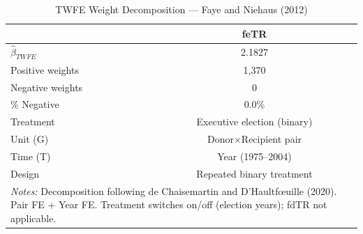 \begin{table}[htbp]
\centering
\caption{TWFE Weight Decomposition --- Faye and Niehaus (2012)}
\label{tab:fayeniehaus_twowayfe}
\begin{tabular}{lc}
\toprule
 & feTR \\
\midrule
$\hat{\beta}_{TWFE}$ & 2.1827 \\
Positive weights & 1,370 \\
Negative weights & 0 \\
\% Negative & 0.0\% \\
\addlinespace
Treatment & Executive election (binary) \\
Unit (G) & Donor$\times$Recipient pair \\
Time (T) & Year (1975--2004) \\
Design & Repeated binary treatment \\
\bottomrule
\multicolumn{2}{p{0.85\linewidth}}{\footnotesize
 \textit{Notes:} Decomposition following de Chaisemartin and
 D'Haultf\oe uille (2020). Pair FE + Year FE.
 Treatment switches on/off (election years); fdTR not applicable.}
\end{tabular}
\end{table}
